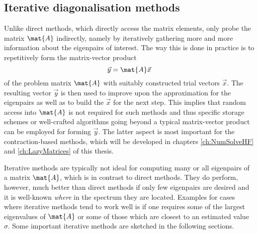 \subsection{Iterative diagonalisation methods}
Unlike direct methods, which directly access the matrix elements,
only probe the matrix $\mat{A}$ indirectly,
namely by iteratively gathering more and more information
about the eigenpairs of interest.
The way this is done in practice is to repetitively form
the matrix-vector product
\[ \vec{y} = \mat{A}\vec{x} \]
of the problem matrix $\mat{A}$
with suitably constructed trial vectors $\vec{x}$.
The resulting vector $\vec{y}$ is then used
to improve upon the approximation for the eigenpairs as well as to
build the $\vec{x}$ for the next step.
This implies that random access into $\mat{A}$
is not required for such methods and thus specific storage schemes
or well-crafted algorithms going beyond a typical matrix-vector product
can be employed for forming $\vec{y}$.
The latter aspect is most important for the contraction-based
methods, which will be developed in chapters
\vref{ch:NumSolveHF} and \vref{ch:LazyMatrices} of this thesis.

Iterative methods are typically not ideal for
computing many or all eigenpairs of a matrix $\mat{A}$,
which is in contrast to direct methods.
They do perform, however, much better than direct methods
if only few eigenpairs are desired
and it is well-known \emph{where} in the spectrum they are located.
Examples for cases where iterative methods tend to work well
is if one requires some of the largest eigenvalues of $\mat{A}$
or some of those which are closest to an estimated value $\sigma$.
Some important iterative methods are sketched in the following sections.

